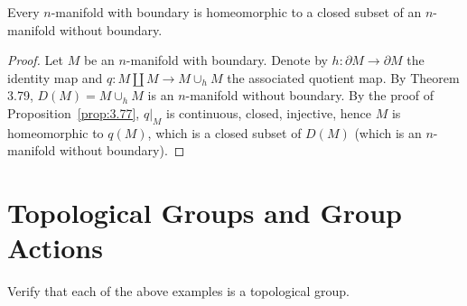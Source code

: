 \begin{prop}{3.81}
    Every $n$-manifold with boundary is homeomorphic to a closed subset of an $n$-manifold without boundary.
\end{prop}

\begin{proof}
    Let $M$ be an $n$-manifold with boundary. Denote by $h: \partial M \to \partial M$ the identity map and $q: M\amalg M \to M \cup_{h} M$ the associated quotient map. By Theorem 3.79, $D(M) = M \cup_{h} M$ is an $n$-manifold without boundary. By the proof of Proposition~\ref{prop:3.77}, $q\vert_{M}$ is continuous, closed, injective, hence $M$ is homeomorphic to $q(M)$, which is a closed subset of $D(M)$ (which is an $n$-manifold without boundary).
\end{proof}

\section*{Topological Groups and Group Actions}

\begin{exercise}{3.83}
    Verify that each of the above examples is a topological group.
\end{exercise}

